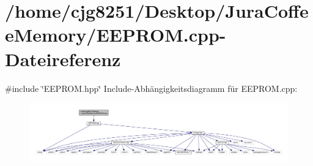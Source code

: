 \section{/home/cjg8251/\+Desktop/\+Jura\+Coffee\+Memory/\+E\+E\+P\+R\+OM.cpp-\/\+Dateireferenz}
\label{_e_e_p_r_o_m_8cpp}
{\ttfamily \#include \char`\"{}E\+E\+P\+R\+O\+M.\+hpp\char`\"{}}\newline
Include-\/\+Abhängigkeitsdiagramm für E\+E\+P\+R\+O\+M.\+cpp\+:
\nopagebreak
\begin{figure}[H]
\begin{center}
\leavevmode
\includegraphics[width=350pt]{_e_e_p_r_o_m_8cpp__incl}
\end{center}
\end{figure}
